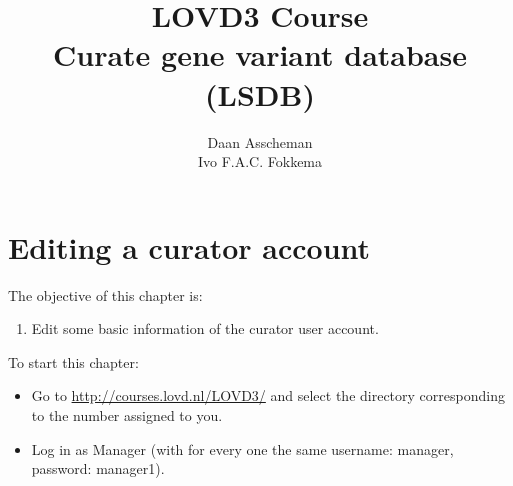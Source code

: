 


\title{LOVD3 Course \\\vskip 0.2cm Curate gene variant database (LSDB)}
\author{Daan Asscheman \\ Ivo F.A.C. Fokkema}
\setpointerwidth{9pt}








\begin{titlingpage} %
\maketitle
\end{titlingpage}





\hypertarget{toc}{}
\tableofcontents










\chapter{Editing a curator account}
The objective of this chapter is:
\begin{enumerate}
	\item 
	Edit some basic information of the curator user account.
\end{enumerate}
To start this chapter:
\begin{itemize}
	\item 
	Go to \url{http://courses.lovd.nl/LOVD3/} and select the directory corresponding to the number assigned to
	 you.
	\item
	Log in as Manager (with for every one the same username: manager, password: \newline manager1).
\end{itemize}

